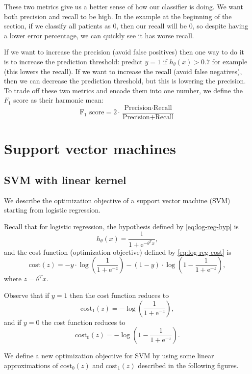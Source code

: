 \documentclass[a4paper,11pt]{report}
\begin{document}
These two metrics give us a better sense of how our classifier is doing. We want both precision and recall to be high. In the example at the beginning of the section, if we classify all patients as 0, then our recall will be $0$, so despite having a lower error percentage, we can quickly see it has worse recall.

If we want to increase the precision (avoid false positives) then one way to do it is to increase the prediction threshold: predict $y=1$ if $h_\theta(x) > 0.7$ for example (this lowers the recall). If we want to increase the recall (avoid false negatives), then we can decrease the prediction threshold, but this is lowering the precision. To trade off these two metrics and encode them into one number, we define the $F_1$ score as their harmonic mean:
\begin{equation}\label{df:F1score}
\textrm{F}_1 \textrm{ score} = 2\cdot \dfrac{\textrm{Precision}\cdot \textrm{Recall}}{\textrm{Precision}+ \textrm{Recall}}
\end{equation}




\chapter{Support vector machines}

\section{SVM with linear kernel}

We describe the optimization objective of a support vector machine (SVM) starting from logistic regression.

Recall that for logistic regression, the hypothesis defined by \ref{eq:log-reg-hyp} is
$$h_\theta(x) = \dfrac{1}{1 + \mathrm{e}^{-\theta^Tx}},$$
and the cost function (optimization objective) defined by \ref{eq:log-reg-cost} is
$$\text{cost}(z) = -y\cdot\log\left(\dfrac{1}{1 + \mathrm{e}^{-z}}\right) - (1-y)\cdot\log\left(1-\dfrac{1}{1 + \mathrm{e}^{-z}}\right),$$
where $z = \theta^Tx$.

Observe that if $y=1$ then the cost function reduces to
$$\text{cost}_1(z) = -\log\left(\dfrac{1}{1 + \mathrm{e}^{-z}}\right),$$
and if $y=0$ the cost function reduces to
$$\text{cost}_0(z) = -\log\left(1-\dfrac{1}{1 + \mathrm{e}^{-z}}\right).$$

We define a new optimization objective for SVM by using some linear approximations of $\text{cost}_0(z)$ and $\text{cost}_1(z)$ described in the following figures.
\end{document}
